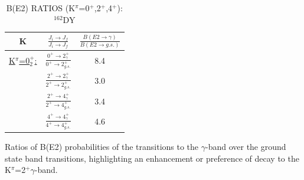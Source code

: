 \begin{table}
\begin{center}
\caption{B(E2) RATIOS (K$^\pi$=0$^+$,2$^+$,4$^+$): $^{162}$DY \label{tab:0_2_BE2ratios}}

\begin{tabular}{ccc}
K & $\frac{J_i\rightarrow J_f}{J_i\rightarrow J_f}$ & $\frac{B(E2\rightarrow\gamma)}{B(E2\rightarrow g.s.)}$ \\ \hline \hline
\underline{K$^\pi$=0$^+_2$:}& $\frac{0^+\rightarrow2^+_\gamma}{0^+\rightarrow2^+_{g.s.}}$ & 8.4 \\
& $\frac{2^+\rightarrow2^+_\gamma}{2^+\rightarrow2^+_{g.s.}}$ & 3.0 \\
& $\frac{2^+\rightarrow4^+_\gamma}{2^+\rightarrow4^+_{g.s.}}$ & 3.4 \\
& $\frac{4^+\rightarrow4^+_\gamma}{4^+\rightarrow4^+_{g.s.}}$ & 4.6 \\
\end{tabular}
\end{center}
Ratios of B(E2) probabilities of the transitions to the $\gamma$-band over the ground state band transitions, highlighting an enhancement or preference of decay to the K$^\pi$=2$^+\gamma$-band.
\end{table}









